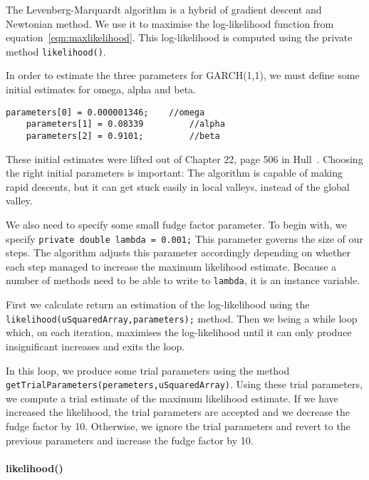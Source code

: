 \documentclass[../Dissertation.tex]{subfiles}
\begin{document}
The Levenberg-Marquardt algorithm is a hybrid of gradient descent and Newtonian method. 
We use it to maximise the log-likelihood function from equation~\ref{eqn:maxlikelihood}.
This log-likelihood is computed using the private method \lstinline|likelihood()|.

In order to estimate the three parameters for GARCH(1,1), we must define some initial estimates for omega, alpha and beta.
\begin{lstlisting}[firstnumber = 176]
	parameters[0] = 0.000001346;	//omega
	parameters[1] = 0.08339			//alpha
	parameters[2] = 0.9101;			//beta
\end{lstlisting}
These initial estimates were lifted out of Chapter 22, page 506 in Hull~\cite{Hull:2012}.
Choosing the right initial parameters is important: The algorithm is capable of making rapid descents, but it can get stuck easily in local valleys, instead of the global valley.

We also need to specify some small fudge factor parameter. 
To begin with, we specify \lstinline|private double lambda = 0.001;|
This parameter governs the size of our steps.
The algorithm adjusts this parameter accordingly depending on whether each step managed to increase the maximum likelihood estimate.
Because a number of methods need to be able to write to \lstinline|lambda|, it is an instance variable.

First we calculate return an estimation of the log-likelihood using the \lstinline|likelihood(uSquaredArray,parameters);| method.
Then we being a while loop which, on each iteration, maximises the log-likelihood until it can only produce insignificant increases and exits the loop.

In this loop, we produce some trial parameters using the method \lstinline|getTrialParameters(perameters,uSquaredArray)|.
Using these trial parameters, we compute a trial estimate of the maximum likelihood estimate.
If we have increased the likelihood, the trial parameters are accepted and we decrease the fudge factor by 10.
Otherwise, we ignore the trial parameters and revert to the previous parameters and increase the fudge factor by 10.

\paragraph{likelihood()}
\end{document}
